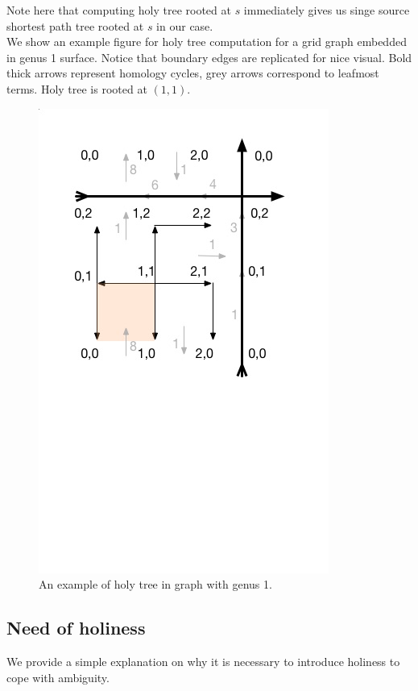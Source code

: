 \documentclass{article}
\begin{document}
Note here that computing holy tree rooted at $s$ immediately gives us singe
source shortest path tree rooted at $s$ in our case. \\

We show an example figure for holy tree computation for a grid graph 
embedded in genus 1 surface. Notice that boundary edges are replicated for nice 
visual. Bold thick arrows represent homology cycles, grey arrows correspond to 
leafmost terms. Holy tree is rooted at $(1, 1)$. 

\begin{figure}
\centering
\includegraphics[scale = 0.5]{figures/g1.jpg}
\vspace{-3.5cm} %
\caption{An example of holy tree in graph with genus 1.}
\end{figure}

\subsection{Need of holiness}
We provide a simple explanation on why it is necessary to introduce holiness
to cope with ambiguity. \\
\end{document}
